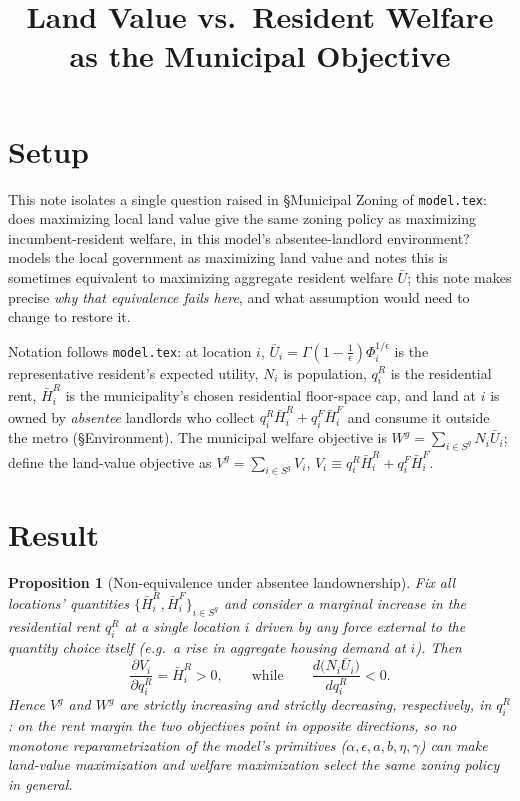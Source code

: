 \documentclass[12pt, a4paper]{article}
\title{Land Value vs.\ Resident Welfare as the Municipal Objective}
\author{}
\date{}
\theoremstyle{plain}
\newtheorem{proposition}{Proposition}
\theoremstyle{remark}
\begin{document}
\maketitle

\section*{Setup}

This note isolates a single question raised in \S Municipal Zoning of \texttt{model.tex}: does maximizing local land value give the same zoning policy as maximizing incumbent-resident welfare, in this model's absentee-landlord environment? \citet{Bordeu2026-df} models the local government as maximizing land value and notes this is sometimes equivalent to maximizing aggregate resident welfare $\bar U$; this note makes precise \emph{why that equivalence fails here}, and what assumption would need to change to restore it.

Notation follows \texttt{model.tex}: at location $i$, $\bar U_i=\Gamma(1-\tfrac1\epsilon)\Phi_i^{1/\epsilon}$ is the representative resident's expected utility, $N_i$ is population, $q_i^R$ is the residential rent, $\bar H_i^R$ is the municipality's chosen residential floor-space cap, and land at $i$ is owned by \emph{absentee} landlords who collect $q_i^R\bar H_i^R+q_i^F\bar H_i^F$ and consume it outside the metro (\S Environment). The municipal welfare objective is $W^g=\sum_{i\in S^g}N_i\bar U_i$; define the land-value objective as $V^g=\sum_{i\in S^g}V_i$, $V_i \equiv q_i^R\bar H_i^R+q_i^F\bar H_i^F$.

\section*{Result}

\begin{proposition}[Non-equivalence under absentee landownership]
\label{prop:nonequiv}
Fix all locations' quantities $\{\bar H_{i}^R,\bar H_i^F\}_{i\in S^g}$ and consider a marginal increase in the residential rent $q_i^R$ at a single location $i$ driven by any force external to the quantity choice itself (e.g.\ a rise in aggregate housing demand at $i$). Then
\[
\frac{\partial V_i}{\partial q_i^R} = \bar H_i^R > 0,
\qquad\text{while}\qquad
\frac{d\bigl(N_i\bar U_i\bigr)}{d q_i^R} < 0.
\]
Hence $V^g$ and $W^g$ are strictly increasing and strictly decreasing, respectively, in $q_i^R$: on the rent margin the two objectives point in opposite directions, so no monotone reparametrization of the model's primitives ($\alpha,\epsilon,a,b,\eta,\gamma$) can make land-value maximization and welfare maximization select the same zoning policy in general.
\end{proposition}
\end{document}
